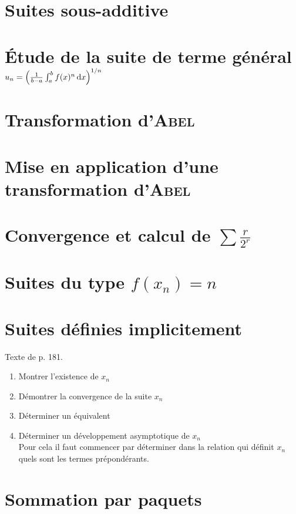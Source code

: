 \section{Suites sous-additive}


\section{Étude de la suite de terme général \texorpdfstring{$u_n = \left( \frac{1}{b-a} \int_{a}^{b} f(x)^n \, \mathrm{d} x \right)^{1/n}$}{égal à une intégrale}}


\section{Transformation d'\textsc{Abel}} \label{transformation_abel}


\section{Mise en application d'une transformation d'\textsc{Abel}}


\section{Convergence et calcul de  \texorpdfstring{$\sum \frac{r}{2^r}$}{de la série de terme général r/2^r}}


\section{Suites du type \texorpdfstring{$f(x_n) = n$}{f(x_n) = n}}


\section{Suites définies implicitement}

\begin{methode}
    Texte de \cite{oraux_x_ens_3} p. 181.
    \begin{enumerate}
        \item Montrer l'existence de $x_n$
        \item Démontrer la convergence de la suite $x_n$
        \item Déterminer un équivalent 
        \item Déterminer un développement asymptotique de $x_n$ \\
        Pour cela il faut commencer par déterminer dans la relation qui définit $x_n$ quels sont les termes prépondérants. 
    \end{enumerate}
\end{methode}

\section{Sommation par paquets}
